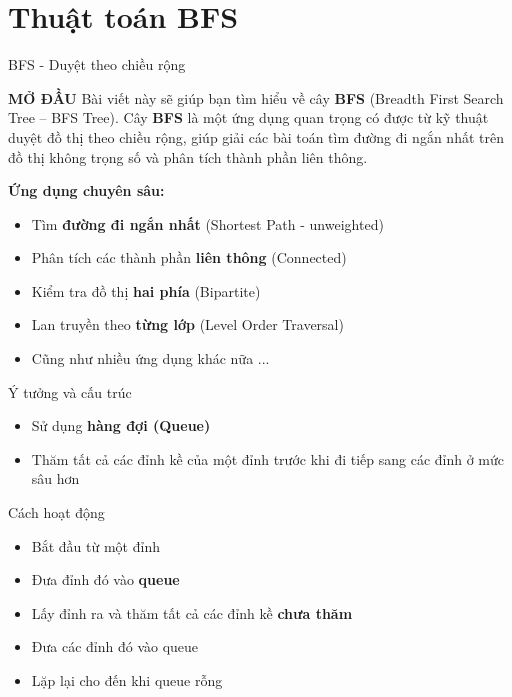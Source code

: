 \documentclass{beamer}
\begin{document}
\section{Thuật toán BFS}



\begin{frame}{BFS - Duyệt theo chiều rộng}

    \begin{block}{\textbf{MỞ ĐẦU}}
        Bài viết này sẽ giúp bạn tìm hiểu về cây \textbf{BFS} (Breadth First Search Tree – BFS Tree). Cây \textbf{BFS} là một ứng dụng quan trọng có được từ kỹ thuật duyệt đồ thị theo chiều rộng, giúp giải các bài toán tìm đường đi ngắn nhất trên đồ thị không trọng số và phân tích thành phần liên thông.
    \end{block}
    \pause
    \textbf{Ứng dụng chuyên sâu:}
    \begin{itemize}
        \item Tìm \textbf{đường đi ngắn nhất} (Shortest Path - unweighted)
        \item Phân tích các thành phần \textbf{liên thông} (Connected)
        \item Kiểm tra đồ thị \textbf{hai phía} (Bipartite)
        \item Lan truyền theo \textbf{từng lớp} (Level Order Traversal)
        \item Cũng như nhiều ứng dụng khác nữa ...
    \end{itemize}
\end{frame}

\begin{frame}

    \begin{block}{Ý tưởng và cấu trúc}
        \begin{itemize}
            \item Sử dụng \textbf{hàng đợi (Queue)}
            \item Thăm tất cả các đỉnh kề của một đỉnh trước khi đi tiếp sang các đỉnh ở mức sâu hơn
        \end{itemize}
    \end{block}
    \pause
    \begin{exampleblock}{Cách hoạt động}
        \begin{itemize}
            \item Bắt đầu từ một đỉnh
            \item Đưa đỉnh đó vào \textbf{queue}
            \item Lấy đỉnh ra và thăm tất cả các đỉnh kề \textbf{chưa thăm}
            \item Đưa các đỉnh đó vào queue
            \item Lặp lại cho đến khi queue rỗng
        \end{itemize}
    \end{exampleblock}
\end{frame}
\end{document}
